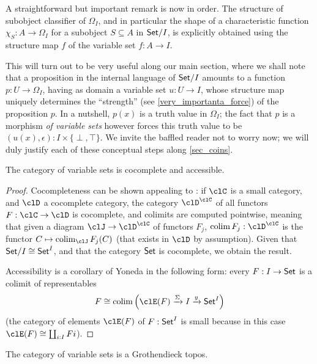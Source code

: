 \begin{remark}
  A straightforward but important remark is now in order. The structure of subobject classifier of $\Omega_I$, and in particular the shape of a characteristic function $\chi_S : A \to \Omega_I$ for a subobject $S\subseteq A$ in $\mathsf{Set}/I$, is explicitly obtained using the structure map $f$ of the variable set $f : A\to I$.

  This will turn out to be very useful along our main section, where we shall note that a proposition in the internal language of $\mathsf{Set}/I$ amounts to a function $p : U \to \Omega_I$, having as domain a variable set $u : U \to I$, whose structure map uniquely determines the ``strength'' (see \autoref{very_importanta_force}) of the proposition $p$. In a nutshell, $p(x)$ is a truth value in $\Omega_I$; the fact that $p$ is a morphism \emph{of variable sets} however forces this truth value to be $(u(x),\epsilon) : I\times \{\perp,\top\}$. We invite the baffled reader not to worry now; we will duly justify each of these conceptual steps along \autoref{sec_coins}.
\end{remark}
\begin{proposition}
  The category of variable sets is cocomplete and accessible.
\end{proposition}
\begin{proof}
  Cocompleteness can be shown appealing to \cite[??]{Bor1}: if $\clC$ is a small category, and $\clD$ a cocomplete category, the category $\clD^\clC$ of all functors $F : \clC \to \clD$ is cocomplete, and colimits are computed pointwise, meaning that given a diagram $\clJ \to \clD^\clC$ of functors $F_j$, $\colim F_j : \clD^\clC$ is the functor $C \mapsto \colim_\clJ F_j(C)$ (that exists in $\clD$ by assumption).
  Given that $\mathsf{Set}/I\cong \mathsf{Set}^I$, and that the category $\mathsf{Set}$ is cocomplete, we obtain the result.

  Accessibility is a corollary of Yoneda in the following form: every $F : I \to \mathsf{Set}$ is a colimit of representables
  \[
    F \cong \colim\Big(\clE(F) \xto{\Sigma} I \xto{y} \Set^I\Big)
  \]
  (the category of elements \cite{Bor1} $\clE(F)$ of $F:\mathsf{Set}^I$ is small because in this case $\clE(F)\cong\coprod_{i: I}Fi$).
\end{proof}
\begin{corollary}
  The category of variable sets is a Grothendieck topos.
\end{corollary}
